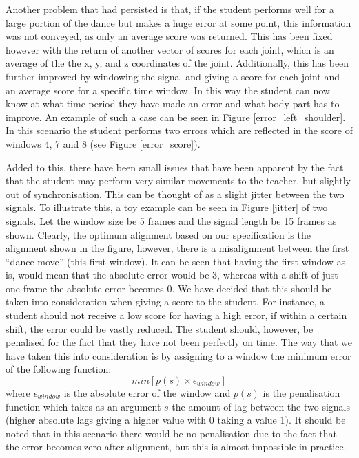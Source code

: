 \documentclass[11pt,a4paper]{article}
\begin{document}
\noindent
Another problem that had persisted is that, if the student performs well for a large portion of the dance but makes a huge error at some point, this information was not conveyed, as only an average score was returned. This has been fixed however with the return of another vector of scores for each joint, which is an average of the the x, y, and z coordinates of the joint. Additionally, this has been further improved by windowing the signal and giving a score for each joint and an average score for a specific time window. In this way the student can now know at what time period they have made an error and what body part has to improve. An example of such a case can be seen in Figure \ref{error_left_shoulder}. In this scenario the student performs two errors which are reflected in the score of windows 4, 7 and 8 (see Figure \ref{error_score}).
 
\noindent
Added to this, there have been small issues that have been apparent by the fact that the student may perform very similar movements to the teacher, but slightly out of synchronisation. This can be thought of as a slight jitter between the two signals. To illustrate this, a toy example can be seen in Figure \ref{jitter} of two signals. Let the window size be 5 frames and the signal length be 15 frames as shown. Clearly, the optimum alignment based on our specification is the alignment shown in the figure, however, there is a misalignment between the first ``dance move'' (this first window). It can be seen that having the first window as is, would mean that the absolute error would be 3, whereas with a shift of just one frame the absolute error becomes 0. We have decided that this should be taken into consideration when giving a score to the student. For instance, a student should not receive a low score for having a high error, if within a certain shift, the error could be vastly reduced. The student should, however, be penalised for the fact that they have not been perfectly on time. The way that we have taken this into consideration is by assigning to a window the minimum error of the following function:
\begin{equation}
min\left[p(s) \times \epsilon_{window}\right]
\end{equation}
where $\epsilon_{window}$ is the absolute error of the window and $p(s)$ is the penalisation function which takes as an argument $s$ the amount of lag between the two signals (higher absolute lags giving a higher value with 0 taking a value 1). It should be noted that in this scenario there would be no penalisation due to the fact that the error becomes zero after alignment, but this is almost impossible in practice. 
\end{document}
